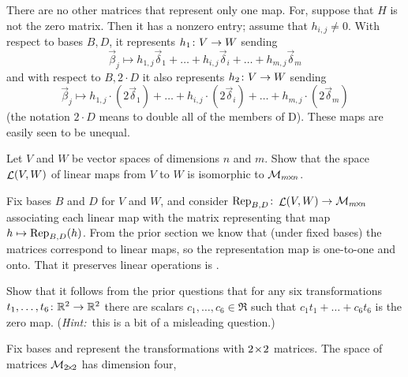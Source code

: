 \begin{exercises}
\begin{answer}
      There are no other matrices that represent only one map.
      For, suppose that \( H \) is 
      not the zero matrix.
      Then it has a nonzero entry; assume that \( h_{i,j}\neq 0 \).
      With respect to bases $B,D$, it represents \( \map{h_1}{V}{W} \) 
      sending
      \begin{equation*}
        \vec{\beta}_j\mapsto
        h_{1,j}\vec{\delta}_1+\dots+h_{i,j}\vec{\delta}_i
          +\dots+h_{m,j}\vec{\delta}_m
      \end{equation*}
      and with respect to $B,2\cdot D$ it also represents 
      \( \map{h_2}{V}{W} \) sending
      \begin{equation*}
        \vec{\beta}_j\mapsto
        h_{1,j}\cdot(2\vec{\delta}_1)+\dots+h_{i,j}\cdot(2\vec{\delta}_i)
          +\dots+h_{m,j}\cdot(2\vec{\delta}_m)
      \end{equation*}
      (the notation $2\cdot D$ means to double 
      all of the members of D). 
      These maps are easily seen to be unequal. 
     \end{answer}
  \recommended \item \label{exer:LinMapsIsoMatSp}
    Let \( V \) and \( W \) be vector spaces of dimensions \( n \) and \( m \).
    Show that the space \( \linmaps{V}{W} \) of linear maps from \( V \) to
    \( W \) is isomorphic to \( \matspace_{\nbym{m}{n}} \).
    \begin{answer}
      Fix bases \( B \) and \( D \) for \( V \) and \( W \), and consider  
      \( \map{\mbox{Rep}_{B,D}}{\linmaps{V}{W}}{\matspace_{\nbym{m}{n}}} \)
      associating each linear map with the matrix representing that map
      $h\mapsto \rep{h}{B,D}$.
      From the prior section we know that (under fixed bases) 
      the matrices correspond to linear maps, 
      so the representation map is one-to-one and onto.
      That it preserves linear operations is     
      .
    \end{answer}
  \recommended \item 
    Show that it follows from the prior questions that
    for any six transformations
    \( \map{t_1,\dots,t_6}{\Re^2}{\Re^2} \)
    there are scalars \( c_1,\dots,c_6\in\Re \) such that
    \( c_1t_1+\dots+c_6t_6 \) is the zero map.
    (\textit{Hint:}~this is a bit of a misleading question.)
    \begin{answer}
      Fix bases and represent the transformations with
      \( \nbyn{2} \) matrices.
      The space of matrices \( \matspace_{\nbyn{2}} \) has dimension four,

\end{answer}
\end{exercises}
